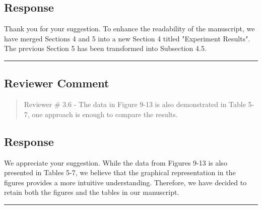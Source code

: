 \subsection{Response}

Thank you for your suggestion. To enhance the readability of the manuscript, we have merged Sections 4 and 5 into a new Section 4 titled "Experiment Results". The previous Section 5 has been transformed into Subsection 4.5.

\noindent\rule{\linewidth}{2.0pt}

\subsection{Reviewer Comment}
\begin{mdframed}
	\begin{quote}
		Reviewer \# 3.6 - The data in Figure 9-13 is also demonstrated in Table 5-7, one approach is enough to compare the results.
	\end{quote}
\end{mdframed}

\subsection{Response}

We appreciate your suggestion. While the data from Figures 9-13 is also presented in Tables 5-7, we believe that the graphical representation in the figures provides a more intuitive understanding. Therefore, we have decided to retain both the figures and the tables in our manuscript.

\noindent\rule{\linewidth}{6.0pt}